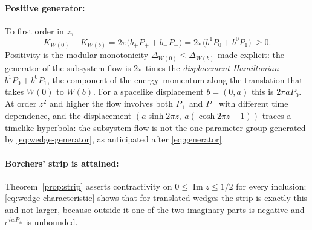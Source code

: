 \documentclass[a4paper,11pt]{article}
\theoremstyle{definition}
\begin{document}
\paragraph{Positive generator:} To first order in $z$,
\begin{equation}
 K_{W(0)}-K_{W(b)}=2\pi\bigl(b_+P_++b_-P_-\bigr)=2\pi\bigl(b^1P_0+b^0P_1\bigr)\ \ge0 .
 \label{eq:wedge-generator}
\end{equation}
Positivity is the modular monotonicity $\Delta_{W(0)}\le\Delta_{W(b)}$ made explicit: the generator of the subsystem flow is $2\pi$ times the \emph{displacement Hamiltonian} $b^1P_0+b^0P_1$, the component of the energy--momentum along the translation that takes $W(0)$ to $W(b)$. For a spacelike displacement $b=(0,a)$ this is $2\pi aP_0$. At order $z^2$ and higher the flow involves both $P_+$ and $P_-$ with different time dependence, and the displacement $(a\sinh2\pi z,\ a(\cosh2\pi z-1))$ traces a timelike hyperbola: the subsystem flow is not the one-parameter group generated by \eqref{eq:wedge-generator}, as anticipated after \eqref{eq:generator}.

\paragraph{Borchers' strip is attained:} Theorem~\ref{prop:strip} asserts contractivity on $0\le\operatorname{Im}z\le1/2$ for every inclusion; \eqref{eq:wedge-characteristic} shows that for translated wedges the strip is exactly this and not larger, because outside it one of the two imaginary parts is negative and $e^{iwP_\pm}$ is unbounded.
\end{document}
